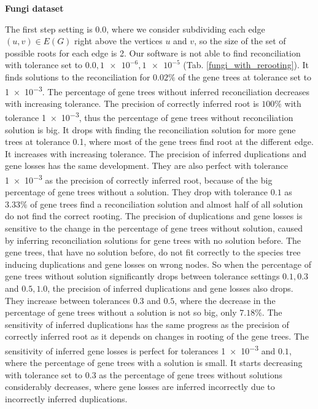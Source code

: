 \noindent \textbf{Fungi dataset}

The first step setting is $0.0$, where we consider subdividing each edge $(u,v) \in E(G)$ right above the vertices $u$ and $v$, so the size of the set of possible roots for each edge is 2. Our software is not able to find reconciliation with tolerance set to $0.0, \num{1e-6}, \num{1e-5}$ (Tab. \ref{fungi_with_rerooting}). It finds solutions to the reconciliation for $0.02\%$ of the gene trees at tolerance set to \num{1e-3}. The percentage of gene trees without inferred reconciliation decreases with increasing tolerance. The precision of correctly inferred root is $100\%$ with tolerance \num{1e-3}, thus the percentage of gene trees without reconciliation solution is big. It drops with finding the reconciliation solution for more gene trees at tolerance \num{0.1}, where most of the gene trees find root at the different edge. It increases with increasing tolerance. The precision of inferred duplications and gene losses has the same development. They are also perfect with tolerance \num{1e-3} as the precision of correctly inferred root, because of the big percentage of gene trees without a solution. They drop with tolerance $0.1$ as $3.33\%$ of gene trees find a reconciliation solution and almost half of all solution do not find the correct rooting. The precision of duplications and gene losses is sensitive to the change in the percentage of gene trees without solution, caused by inferring reconciliation solutions for gene trees with no solution before. The gene trees, that have no solution before, do not fit correctly to the species tree inducing duplications and gene losses on wrong nodes. So when the percentage of gene trees without solution significantly drops between tolerance settings $0.1, 0.3$ and $0.5, 1.0$, the precision of inferred duplications and gene losses also drops. They increase between tolerances $0.3$ and $0.5$, where the decrease in the percentage of gene trees without a solution is not so big, only $7.18\%$. The sensitivity of inferred duplications has the same progress as the precision of correctly inferred root as it depends on changes in rooting of the gene trees. The sensitivity of inferred gene losses is perfect for tolerances \num{1e-3} and $0.1$, where the percentage of gene trees with a solution is small. It starts decreasing with tolerance set to $0.3$ as the percentage of gene trees without solutions considerably decreases, where gene losses are inferred incorrectly due to incorrectly inferred duplications.

